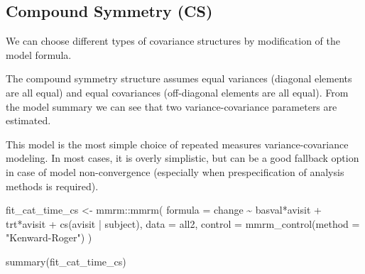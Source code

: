 \documentclass[
  letterpaper,
  DIV=11,
  numbers=noendperiod]{scrreprt}
\newenvironment{Shaded}{\begin{snugshade}}{\end{snugshade}}
\newcommand{\AttributeTok}[1]{\textcolor[rgb]{0.40,0.45,0.13}{#1}}
\newcommand{\FunctionTok}[1]{\textcolor[rgb]{0.28,0.35,0.67}{#1}}
\newcommand{\NormalTok}[1]{\textcolor[rgb]{0.00,0.23,0.31}{#1}}
\newcommand{\OtherTok}[1]{\textcolor[rgb]{0.00,0.23,0.31}{#1}}
\newcommand{\SpecialCharTok}[1]{\textcolor[rgb]{0.37,0.37,0.37}{#1}}
\newcommand{\StringTok}[1]{\textcolor[rgb]{0.13,0.47,0.30}{#1}}
\begin{document}
\hypertarget{compound-symmetry-cs-1}{%
\subsection{Compound Symmetry (CS)}\label{compound-symmetry-cs-1}}

We can choose different types of covariance structures by modification
of the model formula.

The compound symmetry structure assumes equal variances (diagonal
elements are all equal) and equal covariances (off-diagonal elements are
all equal). From the model summary we can see that two
variance-covariance parameters are estimated.

This model is the most simple choice of repeated measures
variance-covariance modeling. In most cases, it is overly simplistic,
but can be a good fallback option in case of model non-convergence
(especially when prespecification of analysis methods is required).

\begin{Shaded}
\begin{Highlighting}[]
\NormalTok{fit\_cat\_time\_cs }\OtherTok{\textless{}{-}}\NormalTok{ mmrm}\SpecialCharTok{::}\FunctionTok{mmrm}\NormalTok{(}
  \AttributeTok{formula =}\NormalTok{ change }\SpecialCharTok{\textasciitilde{}}\NormalTok{ basval}\SpecialCharTok{*}\NormalTok{avisit }\SpecialCharTok{+}\NormalTok{ trt}\SpecialCharTok{*}\NormalTok{avisit }\SpecialCharTok{+} \FunctionTok{cs}\NormalTok{(avisit }\SpecialCharTok{|}\NormalTok{ subject),}
  \AttributeTok{data =}\NormalTok{ all2,}
  \AttributeTok{control =} \FunctionTok{mmrm\_control}\NormalTok{(}\AttributeTok{method =} \StringTok{"Kenward{-}Roger"}\NormalTok{)}
\NormalTok{)}

\FunctionTok{summary}\NormalTok{(fit\_cat\_time\_cs)}
\end{Highlighting}
\end{Shaded}
\end{document}
